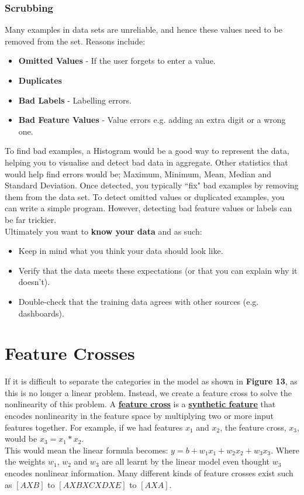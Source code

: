\documentclass[12pt]{article}
\begin{document}
\subsubsection{Scrubbing}
Many examples in data sets are unreliable, and hence these values need to be removed from the set. Reasons include:
\begin{itemize}
	\item \textbf{Omitted Values} - If the user forgets to enter a value.
	\item \textbf{Duplicates}
	\item \textbf{Bad Labels} - Labelling errors.
	\item \textbf{Bad Feature Values} - Value errors e.g. adding an extra digit or a wrong one.
\end{itemize}
To find bad examples, a Histogram would be a good way to represent the data, helping you to visualise and detect bad data in aggregate. Other statistics that would help find errors would be; Maximum, Minimum, Mean, Median and Standard Deviation.
Once detected, you typically ``fix" bad examples by removing them from the data set. To detect omitted values or duplicated examples, you can write a simple program. However, detecting bad feature values or labels can be far trickier.
\\Ultimately you want to \textbf{know your data} and as such: 
\begin{itemize}
	\item Keep in mind what you think your data should look like.
	\item Verify that the data meets these expectations (or that you can explain why it doesn’t).
	\item Double-check that the training data agrees with other sources (e.g. dashboards).
\end{itemize}
\section{Feature Crosses}
If it is difficult to separate the categories in the model as shown in \textbf{Figure 13}, as this is no longer a linear problem. Instead, we create a feature cross to solve the nonlinearity of this problem. A \href{https://developers.google.com/machine-learning/glossary#feature_cross}{\textbf{feature cross}} is a \href{https://developers.google.com/machine-learning/glossary#synthetic_feature}{\textbf{synthetic feature}} that encodes nonlinearity in the feature space by multiplying two or more input features together. For example, if we had features $x_1$ and $x_2$, the feature cross, $x_3$, would be $x_3 = x_1 * x_2$.
\\This would mean the linear formula becomes: $y = b + w_1x_1 + w_2x_2 + w_3x_3$. Where the weights $w_1$, $w_2$ and $w_3$ are all learnt by the linear model even thought $w_3$ encodes nonlinear information. Many different kinds of feature crosses exist such as $[A X B]$ to $[A X B X C X D X E]$ to $[A X A]$.
\end{document}
